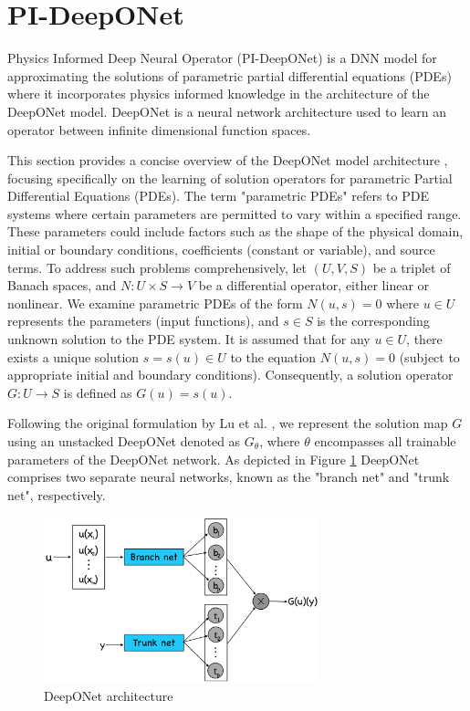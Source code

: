 \documentclass[a4paper,12pt]{article}
\theoremstyle{definition}
\begin{document}
\clearpage
\section{PI-DeepONet}
Physics Informed Deep Neural Operator (PI-DeepONet) is a DNN model for approximating  
the solutions of parametric partial differential equations (PDEs) where it incorporates 
physics informed knowledge in the architecture of the DeepONet model.
DeepONet is a neural network architecture used to learn
an operator between infinite dimensional function spaces. 

This section provides a concise overview of the DeepONet model architecture \cite{wang2021learning}, 
focusing specifically on the learning of solution operators for parametric Partial Differential Equations
(PDEs). The term "parametric PDEs" refers to PDE systems where certain parameters are permitted to vary 
within a specified range. These parameters could include factors such as the shape of the physical domain,
initial or boundary conditions, coefficients (constant or variable), and source terms. To address such 
problems comprehensively, let $(U, V, S)$ be a triplet of Banach spaces, and $N: U \times S \rightarrow
V$ be a differential operator, either linear or nonlinear. We examine parametric PDEs of the form 
$N(u, s) = 0$ \cite{wang2021learning} where $u \in U$ represents the parameters (input functions),
and $s \in S$ is the corresponding unknown solution to the PDE system. It is assumed that for any
$u \in U$, there exists a unique solution $s = s(u) \in U$ to the equation $N(u, s) = 0$ (subject to
appropriate initial and boundary conditions). Consequently, a solution operator $G: U \rightarrow S$ 
is defined as $G(u) = s(u)$. 

Following the original formulation by Lu et al. \cite{wang2021learning}, 
we represent the solution map $G$ using an unstacked DeepONet denoted as $G_{\theta}$, where $\theta$ 
encompasses all trainable parameters of the DeepONet network. As depicted in Figure \ref{DeepONet architecture}
DeepONet comprises two separate neural networks, known as the "branch net" and "trunk net", respectively.

\begin{figure}
    \centering
    \includegraphics[width=300px]{images/DeepONet.png}
    \caption{DeepONet architecture}
    \label{DeepONet architecture}
\end{figure}
\end{document}
